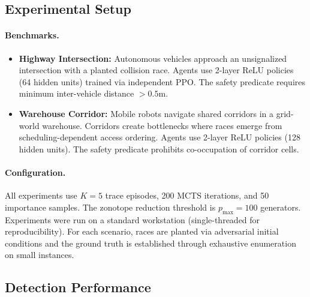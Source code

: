 \documentclass[11pt]{article}
\begin{document}
\subsection{Experimental Setup}

\paragraph{Benchmarks.}
\begin{itemize}[nosep,leftmargin=*]
\item \textbf{Highway Intersection:} Autonomous vehicles approach an
unsignalized intersection with a planted collision race. Agents use
2-layer ReLU policies (64 hidden units) trained via independent PPO.
The safety predicate requires minimum inter-vehicle distance $>0.5$m.
\item \textbf{Warehouse Corridor:} Mobile robots navigate shared corridors
in a grid-world warehouse. Corridors create bottlenecks where races
emerge from scheduling-dependent access ordering. Agents use 2-layer ReLU
policies (128 hidden units). The safety predicate prohibits co-occupation
of corridor cells.
\end{itemize}

\paragraph{Configuration.}
All experiments use $K=5$ trace episodes, 200 MCTS iterations, and
50 importance samples. The zonotope reduction threshold is $p_{\max} = 100$
generators. Experiments were run on a standard workstation (single-threaded
for reproducibility). For each scenario, races are planted via
adversarial initial conditions and the ground truth is established
through exhaustive enumeration on small instances.

\subsection{Detection Performance}
\end{document}
